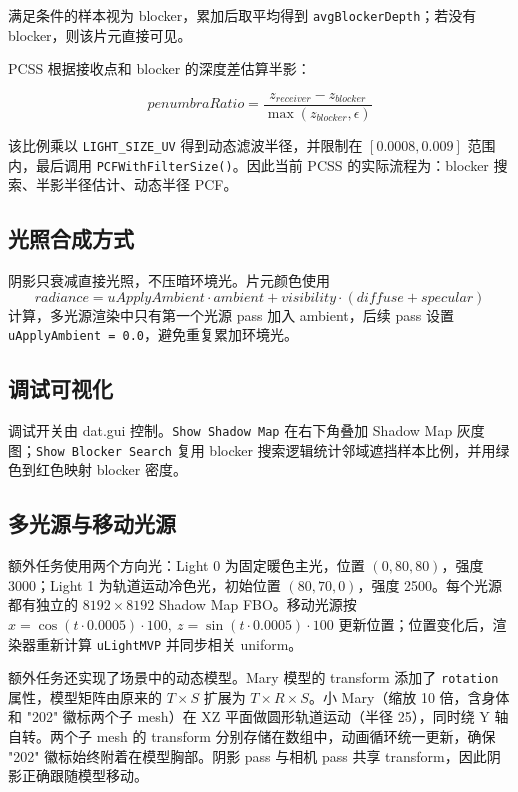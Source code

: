 \documentclass{sjtuarticle}
\begin{document}
满足条件的样本视为 blocker，累加后取平均得到 \texttt{avgBlockerDepth}；若没有 blocker，则该片元直接可见。

PCSS 根据接收点和 blocker 的深度差估算半影：

\[
penumbraRatio=\frac{z_{receiver}-z_{blocker}}{\max(z_{blocker},\epsilon)}
\]

该比例乘以 \texttt{LIGHT\_SIZE\_UV} 得到动态滤波半径，并限制在 \([0.0008,0.009]\) 范围内，最后调用 \texttt{PCFWithFilterSize()}。因此当前 PCSS 的实际流程为：blocker 搜索、半影半径估计、动态半径 PCF。

\subsection{光照合成方式}

阴影只衰减直接光照，不压暗环境光。片元颜色使用
\[
radiance=uApplyAmbient\cdot ambient+visibility\cdot(diffuse+specular)
\]
计算，多光源渲染中只有第一个光源 pass 加入 ambient，后续 pass 设置 \texttt{uApplyAmbient = 0.0}，避免重复累加环境光。

\subsection{调试可视化}

调试开关由 dat.gui 控制。\texttt{Show Shadow Map} 在右下角叠加 Shadow Map 灰度图；\texttt{Show Blocker Search} 复用 blocker 搜索逻辑统计邻域遮挡样本比例，并用绿色到红色映射 blocker 密度。

\subsection{多光源与移动光源}

额外任务使用两个方向光：Light 0 为固定暖色主光，位置 \((0,80,80)\)，强度 3000；Light 1 为轨道运动冷色光，初始位置 \((80,70,0)\)，强度 2500。每个光源都有独立的 \(8192 \times 8192\) Shadow Map FBO。移动光源按 \(x=\cos(t\cdot0.0005)\cdot100,\ z=\sin(t\cdot0.0005)\cdot100\) 更新位置；位置变化后，渲染器重新计算 \texttt{uLightMVP} 并同步相关 uniform。

额外任务还实现了场景中的动态模型。Mary 模型的 transform 添加了 \texttt{rotation} 属性，模型矩阵由原来的 \(T \times S\) 扩展为 \(T \times R \times S\)。小 Mary（缩放 10 倍，含身体和 "202" 徽标两个子 mesh）在 XZ 平面做圆形轨道运动（半径 25），同时绕 Y 轴自转。两个子 mesh 的 transform 分别存储在数组中，动画循环统一更新，确保 "202" 徽标始终附着在模型胸部。阴影 pass 与相机 pass 共享 transform，因此阴影正确跟随模型移动。
\end{document}
